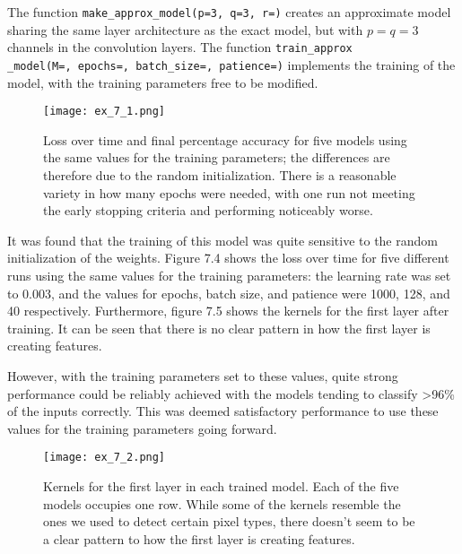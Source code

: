 \documentclass{somasmsc}
\begin{document}
\newpage

\begin{exa}
The function \verb|make_approx_model(p=3, q=3, r=)| creates an approximate model sharing the same layer architecture as the exact model, but with $p=q=3$ channels in the convolution layers. The function \verb|train_approx|\\ \verb|_model(M=, epochs=, batch_size=, patience=)| implements the training of the model, with the training parameters free to be modified.

\begin{figure}[H]\label{digit:ex_7_1}
\begin{center}
\texttt{[image: ex\_7\_1.png]}
\end{center}
\caption{Loss over time and final percentage accuracy for five models using the same values for the training parameters; the differences are therefore due to the random initialization. There is a reasonable variety in how many epochs were needed, with one run not meeting the early stopping criteria and performing noticeably worse.}
\end{figure}

It was found that the training of this model was quite sensitive to the random initialization of the weights. Figure 7.4 shows the loss over time for five different runs using the same values for the training parameters: the learning rate was set to 0.003, and the values for epochs, batch size, and patience were 1000, 128, and 40 respectively. Furthermore, figure 7.5 shows the kernels for the first layer after training. It can be seen that there is no clear pattern in how the first layer is creating features.

However, with the training parameters set to these values, quite strong performance could be reliably achieved with the models tending to classify >96\% of the inputs correctly. This was deemed satisfactory performance to use these values for the training parameters going forward.

\begin{figure}[H]\label{digit:ex_7_2}
\begin{center}
\texttt{[image: ex\_7\_2.png]}
\end{center}
\caption{Kernels for the first layer in each trained model. Each of the five models occupies one row. While some of the kernels resemble the ones we used to detect certain pixel types, there doesn't seem to be a clear pattern to how the first layer is creating features.}
\end{figure}
\end{exa}
\end{document}
